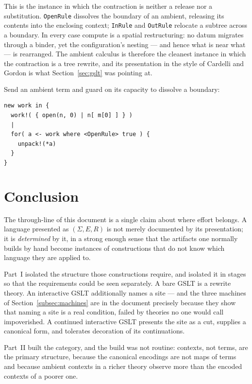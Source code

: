 \documentclass[11pt]{article}
\theoremstyle{definition}
\theoremstyle{plain}
\theoremstyle{remark}
\newcommand{\compute}{\mathrm{compute}}
\begin{document}
This is the instance in which the contraction is neither a release nor a substitution.
\texttt{OpenRule} dissolves the boundary of an ambient, releasing its contents into the
enclosing context; \texttt{InRule} and \texttt{OutRule} relocate a subtree across a
boundary. In every case $\compute$ is a spatial restructuring: no datum migrates through a
binder, yet the configuration's nesting --- and hence what is near what --- is rearranged.
The ambient calculus is therefore the cleanest instance in which the contraction is a tree
rewrite, and its presentation in the style of Cardelli and Gordon is what
Section~\ref{sec:gslt} was pointing at.

Send an ambient term and guard on its capacity to dissolve a boundary:

\begin{lstlisting}
new work in {
  work!( { open(n, 0) | n[ m[0] ] } )
  |
  for( a <- work where <OpenRule> true ) {
    unpack!(*a)
  }
}
\end{lstlisting}

\section{Conclusion}

The through-line of this document is a single claim about where effort belongs. A
language presented as $(\Sigma, E, R)$ is not merely documented by its presentation; it is
\emph{determined} by it, in a strong enough sense that the artifacts one normally builds
by hand become instances of constructions that do not know which language they are applied
to.

Part~I isolated the structure those constructions require, and isolated it in stages so
that the requirements could be seen separately. A bare GSLT is a rewrite theory. An
interactive GSLT additionally names a site --- and the three machines of
Section~\ref{subsec:machines} are in the document precisely because they show that naming
a site is a real condition, failed by theories no one would call impoverished. A continued
interactive GSLT presents the site as a cut, supplies a canonical form, and tolerates
decoration of its continuations.

Part~II built the category, and the build was not routine: contexts, not terms, are the
primary structure, because the canonical encodings are not maps of terms and because
ambient contexts in a richer theory observe more than the encoded contexts of a poorer
one.
\end{document}
